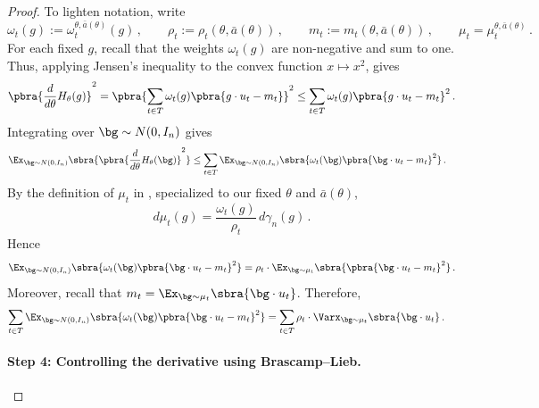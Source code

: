 \documentclass[11pt]{article}
\begin{document}
\begin{proof}
	To lighten notation, write
	\[
		\omega_t(g):=\omega_t^{\theta,\bar{a}(\theta)}(g)\,,
		\qquad
		\rho_t:=\rho_t(\theta,\bar{a}(\theta))\,,
		\qquad
		m_t:=m_t(\theta,\bar{a}(\theta))\,,
		\qquad 
		\mu_t=\mu_t^{\theta,\bar{a}(\theta)}\,.
	\]
	For each fixed $g$, recall that the weights $\omega_t(g)$ are non-negative and sum to one. 
	Thus, applying Jensen's inequality to the convex function $x\mapsto x^2$,  gives
	\begin{equation} 
		\pbra{\frac{d}{d\theta}H_\theta(g)}^2
		=
		\pbra{
		\sum_{t\in T}\omega_t(g)\pbra{g\cdot u_t-m_t}
		}^2
		\leq 
		\sum_{t\in T}
		\omega_t(g)\pbra{g\cdot u_t-m_t}^2\,.
		\label{eq:weighted-jensen-softmax}
	\end{equation}
	Integrating  over $\bg\sim N(0,I_n)$ gives
	\begin{align}
		\Ex_{\bg\sim N(0,I_n)}
		\sbra{
		\pbra{\frac{d}{d\theta}H_\theta(\bg)}^2
		}
		&\leq
		\sum_{t\in T}
		\Ex_{\bg\sim N(0,I_n)}
		\sbra{
		\omega_t(\bg)\pbra{\bg\cdot u_t-m_t}^2
		}\,.
		\label{eq:jensen-soft-active}
	\end{align}
	By the definition of $\mu_t$ in , specialized to our fixed $\theta$ and $\bar a(\theta)$,
	\[
		d\mu_t(g)
		=
		\frac{\omega_t(g)}{\rho_t}\,d\gamma_n(g)\,.
	\]
	Hence
	\[
		\Ex_{\bg\sim N(0,I_n)}
		\sbra{
		\omega_t(\bg)\pbra{\bg\cdot u_t-m_t}^2
		}
		=
		\rho_t
		\cdot 
		\Ex_{\bg\sim\mu_t}
		\sbra{
		\pbra{\bg\cdot u_t-m_t}^2
		}\,.
	\]
	Moreover, recall that $m_t = \Ex_{\bg\sim\mu_t}\sbra{\bg\cdot u_t}$.
	Therefore, 
	\begin{align}
		\sum_{t\in T}
		\Ex_{\bg\sim N(0,I_n)}
		\sbra{
		\omega_t(\bg)\pbra{\bg\cdot u_t-m_t}^2
		}
		&=
		\sum_{t\in T}
		\rho_t 
		\cdot 
		\Varx_{\bg\sim\mu_t}\sbra{\bg\cdot u_t}\,.
		\label{eq:variance-mixture}
	\end{align}
	
	\paragraph{Step 4: Controlling the derivative using Brascamp--Lieb.} 


\end{proof}
\end{document}
